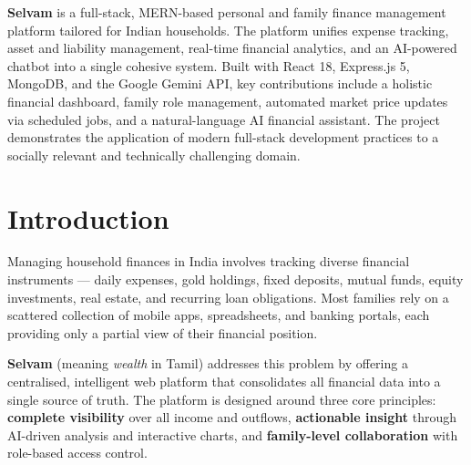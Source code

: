 \documentclass[12pt,a4paper]{article}
\begin{document}

\begin{tcolorbox}[colback=lightblue, colframe=royalblue, title={\bfseries Abstract}, fonttitle=\color{white}]
\textbf{Selvam} is a full-stack, MERN-based personal and family finance management platform tailored for Indian households. The platform unifies expense tracking, asset and liability management, real-time financial analytics, and an AI-powered chatbot into a single cohesive system. Built with React 18, Express.js 5, MongoDB, and the Google Gemini API, key contributions include a holistic financial dashboard, family role management, automated market price updates via scheduled jobs, and a natural-language AI financial assistant. The project demonstrates the application of modern full-stack development practices to a socially relevant and technically challenging domain.
\end{tcolorbox}

\vspace{0.3cm}

\section{Introduction}

Managing household finances in India involves tracking diverse financial instruments — daily expenses, gold holdings, fixed deposits, mutual funds, equity investments, real estate, and recurring loan obligations. Most families rely on a scattered collection of mobile apps, spreadsheets, and banking portals, each providing only a partial view of their financial position.

\textbf{Selvam} (meaning \textit{wealth} in Tamil) addresses this problem by offering a centralised, intelligent web platform that consolidates all financial data into a single source of truth. The platform is designed around three core principles: \textbf{complete visibility} over all income and outflows, \textbf{actionable insight} through AI-driven analysis and interactive charts, and \textbf{family-level collaboration} with role-based access control.

\end{document}
